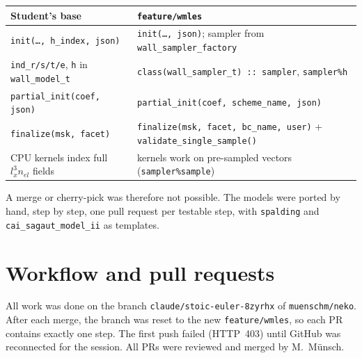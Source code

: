 \documentclass[11pt,a4paper]{article}
\newcommand{\code}[1]{\texttt{#1}}
\begin{document}
\begin{center}
\small
\begin{tabularx}{\textwidth}{>{\raggedright}X>{\raggedright\arraybackslash}X}
\toprule
Student's base & \code{feature/wmles} \\
\midrule
\code{init(\ldots, h\_index, json)} &
  \code{init(\ldots, json)}; sampler from \code{wall\_sampler\_factory} \\
\code{ind\_r/s/t/e}, \code{h} in \code{wall\_model\_t} &
  \code{class(wall\_sampler\_t) :: sampler}, \code{sampler\%h} \\
\code{partial\_init(coef, json)} & \code{partial\_init(coef, scheme\_name, json)} \\
\code{finalize(msk, facet)} &
  \code{finalize(msk, facet, bc\_name, user)} + \code{validate\_single\_sample()} \\
CPU kernels index full $l_x^3 n_{el}$ fields &
  kernels work on pre-sampled vectors (\code{sampler\%sample}) \\
\bottomrule
\end{tabularx}
\end{center}

\noindent A merge or cherry-pick was therefore not possible. The models
were ported by hand, step by step, one pull request per testable step,
with \code{spalding} and \code{cai\_sagaut\_model\_ii} as templates.

\section{Workflow and pull requests}

All work was done on the branch \code{claude/stoic-euler-8zyrhx} of
\code{muenschm/neko}. After each merge, the branch was reset to the new
\code{feature/wmles}, so each PR contains exactly one step. The first push
failed (HTTP~403) until GitHub was reconnected for the session. All PRs were
reviewed and merged by M.~Münsch.
\end{document}
